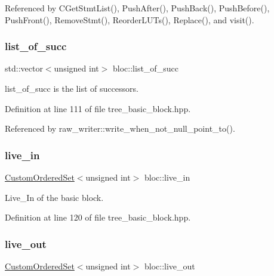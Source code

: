 Referenced by C\+Get\+Stmt\+List(), Push\+After(), Push\+Back(), Push\+Before(), Push\+Front(), Remove\+Stmt(), Reorder\+L\+U\+Ts(), Replace(), and visit().

\mbox{\label{structbloc_a8faef163b09122d4cd10c2f98735be1c}} 
\subsubsection{\texorpdfstring{list\+\_\+of\+\_\+succ}{list\_of\_succ}}
{\footnotesize\ttfamily std\+::vector$<$unsigned int$>$ bloc\+::list\+\_\+of\+\_\+succ}



list\+\_\+of\+\_\+succ is the list of successors. 



Definition at line 111 of file tree\+\_\+basic\+\_\+block.\+hpp.



Referenced by raw\+\_\+writer\+::write\+\_\+when\+\_\+not\+\_\+null\+\_\+point\+\_\+to().

\mbox{\label{structbloc_adf40e8bc34cb48a1fde9e0b17ac00e09}} 
\subsubsection{\texorpdfstring{live\+\_\+in}{live\_in}}
{\footnotesize\ttfamily \hyperlink{classCustomOrderedSet}{Custom\+Ordered\+Set}$<$unsigned int$>$ bloc\+::live\+\_\+in}



Live\+\_\+\+In of the basic block. 



Definition at line 120 of file tree\+\_\+basic\+\_\+block.\+hpp.

\mbox{\label{structbloc_a560e5cc8beef5fdd63181b993910418e}} 
\subsubsection{\texorpdfstring{live\+\_\+out}{live\_out}}
{\footnotesize\ttfamily \hyperlink{classCustomOrderedSet}{Custom\+Ordered\+Set}$<$unsigned int$>$ bloc\+::live\+\_\+out}



